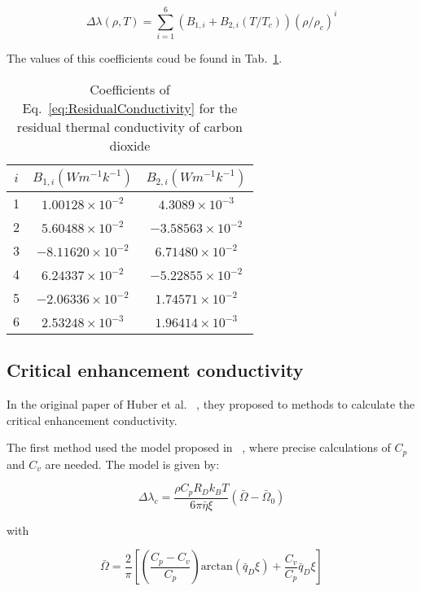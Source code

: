 \begin{equation}
    \Delta\lambda(\rho,T) = \sum_{i=1}^6(B_{1,i} + B_{2,i}(T/T_c))(\rho/\rho_c)^i
	\label{eq:ResidualConductivity}
\end{equation}

The values of this coefficients coud be found in
Tab.~\ref{tab:ResidualConductivity}. 

\begin{table}[h]
    \centering
    \begin{tabular}{c|c|c}
         $i$ & $B_{1,i}(Wm^{-1}k^{-1})$  & $B_{2,i}(Wm^{-1}k^{-1})$\\ 
         \hline
         1  &   $1.00128\times10^{-2}$   & $4.3089\times10^{-3}$\\
         2  &   $5.60488\times10^{-2}$   & $-3.58563\times10^{-2}$\\
         3  &   $-8.11620\times10^{-2}$  & $6.71480\times10^{-2}$\\
         4  &   $6.24337\times10^{-2}$   & $-5.22855\times10^{-2}$\\
         5  &   $-2.06336\times10^{-2}$  & $1.74571\times10^{-2}$\\
         6  &   $2.53248\times10^{-3}$   & $1.96414\times10^{-3}$\\       
    \end{tabular}
    \caption{Coefficients of Eq.~\ref{eq:ResidualConductivity} for the residual
	thermal conductivity of carbon dioxide}
    \label{tab:ResidualConductivity}
\end{table}

\subsection{Critical enhancement conductivity}

In the original paper of Huber et al. ~\cite{huber2016reference}, they proposed
to methods to calculate the critical enhancement conductivity. 

The first method used the model proposed in ~\cite{olchowy1989simplified}, where
precise calculations of $C_p$ and $C_v$ are needed. The model is given by:

\begin{equation}
	\Delta \lambda_c = \frac{\rho C_p R_D k_B T}{6 \pi \bar{\eta}\xi}(\bar{\Omega} - \bar{\Omega}_0)
\end{equation}

with

\begin{equation}
	\bar{\Omega} = \frac{2}{\pi}\left[ \left( \frac{C_p - C_v}{C_p}\right) \mathrm{arctan}(\bar{q}_D\xi) + \frac{C_v}{C_p}\bar{q}_D\xi \right]
\end{equation}

